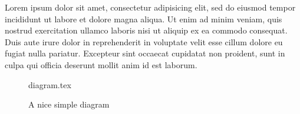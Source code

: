 \documentclass[class=article, crop=false]{standalone}
\begin{document}
Lorem ipsum dolor sit amet, consectetur adipisicing elit, sed do eiusmod tempor incididunt ut labore et dolore magna aliqua. Ut enim ad minim veniam, quis nostrud exercitation ullamco laboris nisi ut aliquip ex ea commodo consequat. Duis aute irure dolor in reprehenderit in voluptate velit esse cillum dolore eu fugiat nulla pariatur. Excepteur sint occaecat cupidatat non proident, sunt in culpa qui officia deserunt mollit anim id est laborum.

\begin{figure}[ht]
	\centering
	{diagram.tex}
	\label{fig:tikzexample}
	\caption{A nice simple diagram}
\end{figure}
\end{document}
